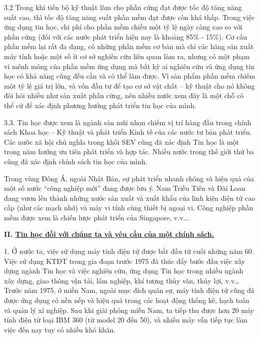 \documentclass[11pt, a4paper, reqno, oneside]{book}
\begin{document}
3.2	Trong khi tiến bộ kỹ thuật làm cho phần cứng đạt được tốc độ tăng năng suất cao, thì tốc độ tăng năng suất phần mềm đạt được còn khá thấp. Trong việc ứng dụng tin học, chi phí cho phần mềm chiều một tỷ lệ ngày càng cao so với phần cứng (đối với các nước phát triển hiện nay là khoảng 85\% - 15\%). Cơ cấu phần mềm lại rất đa dạng, có những phần mềm cơ bản mà chỉ các hãng sản xuất máy tính hoặc một số ít cơ sở nghiên cứu liên quan làm ra, nhưng có một phạm vi mênh mông của phần mềm ứng dụng mà bất kỳ ai nghiên cứu và ứng dụng tin học có khả năng cũng đều cần và có thể làm được. Vì sản phẩm phần mềm chiếm một tỷ lệ giá trị lớn, và vốn đầu tư để tạo cơ sở vật chất – kỹ thuật cho nó không đòi hỏi nhiều như sản xuất phần cứng, nên nhiều nước xem đây là một chỗ có thể cứ để xác định phương hướng phát triển tin học của mình. 


3.3. Tin học được xem là ngành sản mũi nhọn chiếm vị trí hàng đầu trong chính sách Khoa học – Kỹ thuật và phát triển Kinh tế của các nước tư bản phát triển. Các nước xã hội chủ nghĩa trong khối SEV cũng đã xác định Tin học là một trong năm hướng ưu tiên phát triển và hợp tác. Nhiều nước trong thế giới thứ ba cũng đã xác định chính sách tin học của mình.


 Trong vùng Đông Á, ngoài Nhật Bản, sự phát triển nhanh chóng và hiệu quả của một số nước “công nghiệp mới” đang được lưu ý. Nam Triều Tiên và Đài Loan đang vươn lên thành những nước sản xuất và xuất khẩu của linh kiện điện tử cao cấp (như các mạch nhớ) và máy vi tính cùng thiết bị ngoại vi. Công nghiệp phần mềm được xem là chiến lược phát triển của Singapore, v.v….
 
 
\textbf{II. \underline{Tin học đối với chúng ta và yêu cầu của một chính sách.}}


1.	Ở nước ta, việc sử dụng máy tính điện tử được bắt đầu từ cuối những năm 60. Việc sử dụng KTĐT trong gia đoạn trước 1975 đã thúc đẩy bước đầu việc xây dựng ngành Tin học và việc nghiên cứu, ứng dụng Tin học trong nhiều ngành xây dựng, giao thông vận tải, lâm nghiệp, khí tượng thủy văn, thủy lợi, v.v… Trước năm 1975, ở miền Nam, ngoài mục đích quân sự, máy tính điện tử cũng đã được ứng dụng có nền nếp và hiệu quả trong các hoạt động thống kê, hạch toán và quản lý xí nghiệp. Sau khi giải phóng miền Nam, ta tiếp thu được hơn 20 máy tính điện tử loại IBM 360 (từ model 20 đến 50), và nhiều máy vẫn tiếp tục làm việc đến nay tuy có nhiều khó khăn.
\end{document}
